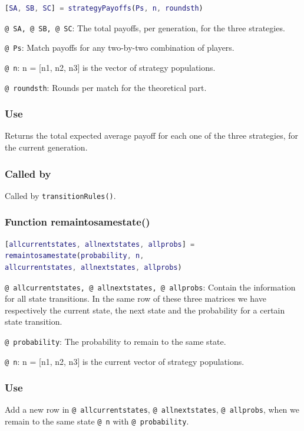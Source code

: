 \documentclass[12pt]{report}
\begin{document}
\begin{lstlisting}[language=Matlab]
[SA, SB, SC] = strategyPayoffs(Ps, n, roundsth)

\end{lstlisting}

\texttt{@ SA, @ SB, @ SC}: The total payoffs, per generation, for the three strategies.

\texttt{@ Ps}: Match payoffs for any two-by-two combination of players.

\texttt{@ n}: n = [n1, n2, n3] is the vector of strategy populations.

\texttt{@ roundsth}: Rounds per match for the theoretical part.

\subsubsection*{Use}
Returns the  total expected average payoff for each one of the three strategies, for the current generation.

\subsubsection*{Called by}
Called by \texttt{transitionRules()}.








\subsubsection*{Function remaintosamestate()}

\begin{lstlisting}[language=Matlab]
[allcurrentstates, allnextstates, allprobs] = 
remaintosamestate(probability, n,
allcurrentstates, allnextstates, allprobs)

\end{lstlisting}

\texttt{@ allcurrentstates, @ allnextstates, @ allprobs}: Contain the information for all state transitions. In the same row of these three matrices we have respectively the current state, the next state and the probability for a certain state transition.

\texttt{@ probability}: The probability to remain to the same state.

\texttt{@ n}: n = [n1, n2, n3] is the current  vector of strategy populations.

\subsubsection*{Use}
Add a new row in \texttt{@ allcurrentstates}, \texttt{@ allnextstates}, \texttt{@ allprobs}, when we remain to the same state \texttt{@ n} with \texttt{@ probability}.
\end{document}
